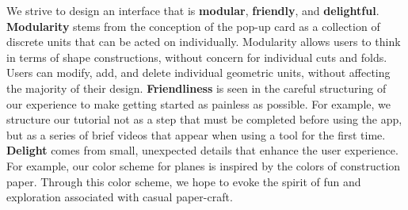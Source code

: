 We strive to design an interface that is \textbf{modular},
\textbf{friendly}, and \textbf{delightful}. \textbf{Modularity} stems
from the conception of the pop-up card as a collection of discrete units
that can be acted on individually. Modularity allows users to think in
terms of shape constructions, without concern for individual cuts and
folds. Users can modify, add, and delete individual geometric units,
without affecting the majority of their design. \textbf{Friendliness} is
seen in the careful structuring of our experience to make getting
started as painless as possible. For example, we structure our tutorial
not as a step that must be completed before using the app, but as a
series of brief videos that appear when using a tool for the first time.
\textbf{Delight} comes from small, unexpected details that enhance the
user experience. For example, our color scheme for planes is inspired by
the colors of construction paper. Through this color scheme, we hope to
evoke the spirit of fun and exploration associated with casual
paper-craft.
